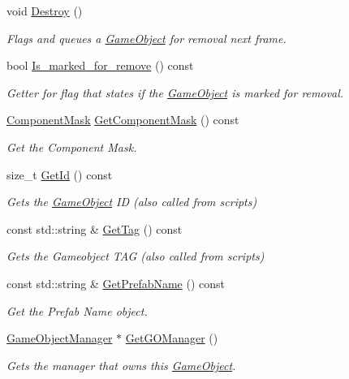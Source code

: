\begin{DoxyCompactItemize}
\mbox{\label{classGameObject_abf1959fad10ea04673a182029f1f81b9}} 
void \hyperlink{classGameObject_abf1959fad10ea04673a182029f1f81b9}{Destroy} ()
\begin{DoxyCompactList}\small\item\em Flags and queues a \hyperlink{classGameObject}{Game\+Object} for removal next frame. \end{DoxyCompactList}\item 
bool \hyperlink{classGameObject_a812be3286e6e8d3839c844c507093395}{Is\+\_\+marked\+\_\+for\+\_\+remove} () const
\begin{DoxyCompactList}\small\item\em Getter for flag that states if the \hyperlink{classGameObject}{Game\+Object} is marked for removal. \end{DoxyCompactList}\item 
\hyperlink{classGameObject_aec670daa4bbc9e2956937b0b1b55acbe}{Component\+Mask} \hyperlink{classGameObject_aea7bddf2500f760afba95bb9daada51c}{Get\+Component\+Mask} () const
\begin{DoxyCompactList}\small\item\em Get the Component Mask. \end{DoxyCompactList}\item 
size\+\_\+t \hyperlink{classGameObject_a47a9e2307a23923343e23d6c8c4223c1}{Get\+Id} () const
\begin{DoxyCompactList}\small\item\em Gets the \hyperlink{classGameObject}{Game\+Object} ID (also called from scripts) \end{DoxyCompactList}\item 
const std\+::string \& \hyperlink{classGameObject_a6ec65a8b875cfcf7d9155390579fcaab}{Get\+Tag} () const
\begin{DoxyCompactList}\small\item\em Gets the Gameobject T\+AG (also called from scripts) \end{DoxyCompactList}\item 
const std\+::string \& \hyperlink{classGameObject_a6f4378b0219e78cf1852e224ca6545b5}{Get\+Prefab\+Name} () const
\begin{DoxyCompactList}\small\item\em Get the Prefab Name object. \end{DoxyCompactList}\item 
\hyperlink{classGameObjectManager}{Game\+Object\+Manager} $\ast$ \hyperlink{classGameObject_ade4a81b6b0ed07ef656fc5c636ae648b}{Get\+G\+O\+Manager} ()
\begin{DoxyCompactList}\small\item\em Gets the manager that owns this \hyperlink{classGameObject}{Game\+Object}. \end{DoxyCompactList}\end{DoxyCompactItemize}
